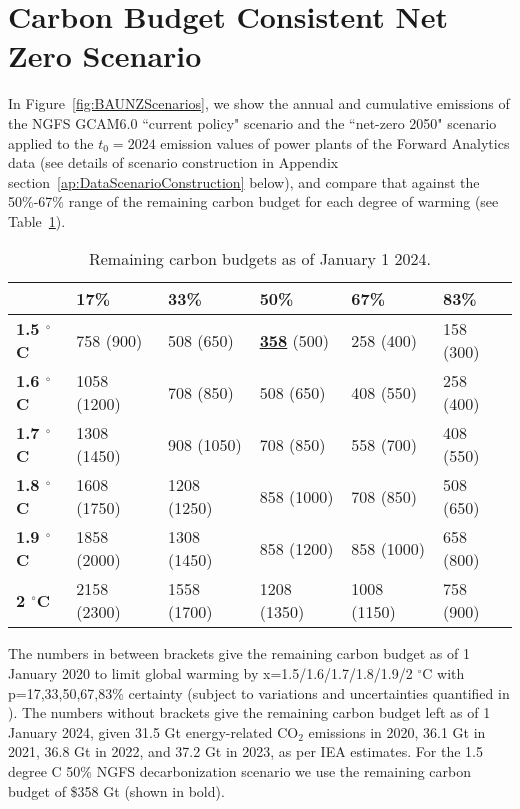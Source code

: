 \documentclass[11pt,a4paper,table,xcdraw]{article}
\begin{document}
\section{Carbon Budget Consistent Net Zero Scenario}

In Figure~\ref{fig:BAUNZScenarios}, we show the annual and cumulative emissions of the NGFS GCAM6.0 ``current policy" scenario and the ``net-zero 2050" scenario applied to the $t_0=2024$ emission values of power plants of the Forward Analytics data (see details of scenario construction in Appendix section~\ref{ap:DataScenarioConstruction} below), and compare that against the 50\%-67\% range of the remaining carbon budget for each degree of warming (see Table~\ref{tab:RemainingCarbonBudgets}). 



\begin{table}[H]
\caption{Remaining carbon budgets as of January 1 2024.}\label{tab:RemainingCarbonBudgets}
\centering
\begin{tabular}{l l l l l l}
\hline
             & \textbf{17\%} & \textbf{33\%} & \textbf{50\%} & \textbf{67\%} & \textbf{83\%} \\
\hline
\textbf{1.5 $^{\circ}$C} & 758 (900)         & 508 (650)        & \uline{\textbf{358}} (500)         & 258 (400)         & 158 (300)         \\
\textbf{1.6 $^{\circ}$C} & 1058 (1200)        & 708 (850)        & 508 (650)         & 408 (550)         & 258 (400)         \\
\textbf{1.7 $^{\circ}$C} & 1308 (1450)       & 908 (1050)       & 708 (850)         & 558 (700)         & 408 (550)       \\
\textbf{1.8 $^{\circ}$C} & 1608 (1750)        & 1208 (1250)       & 858 (1000)      & 708 (850)         & 508 (650)         \\
\textbf{1.9 $^{\circ}$C} & 1858 (2000)        & 1308 (1450)        & 858 (1200)        & 858 (1000)        & 658 (800)         \\
\textbf{2 $^{\circ}$C}   & 2158 (2300)      & 1558 (1700)        & 1208 (1350)       & 1008 (1150)       & 758 (900)        \\
\hline
\end{tabular}
\begin{tablenotes}
\item The numbers in between brackets give the remaining carbon budget as of 1 January 2020 to limit global warming by x=1.5/1.6/1.7/1.8/1.9/2 $^{\circ}$C with p=17,33,50,67,83\% certainty (subject to variations and uncertainties quantified in \cite{IPCC2021SynthesisReport}). The numbers without brackets give the remaining carbon budget left as of 1 January 2024, given 31.5 Gt energy-related CO$_2$ emissions in 2020, 36.1 Gt in 2021, 36.8 Gt in 2022, and 37.2 Gt in 2023, as per IEA estimates. For the 1.5 degree C 50\% NGFS decarbonization scenario we use the remaining carbon budget of \$358 Gt (shown in bold). 

\end{tablenotes}
\end{table}
\end{document}
